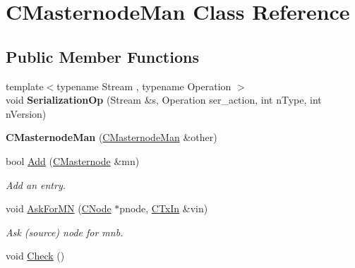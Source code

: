 \hypertarget{class_c_masternode_man}{}\section{C\+Masternode\+Man Class Reference}
\label{class_c_masternode_man}
\subsection*{Public Member Functions}
\begin{DoxyCompactItemize}
\item 
\mbox{\label{class_c_masternode_man_ab8cf7d821cda80603d10fb47f626d514}} 
{\footnotesize template$<$typename Stream , typename Operation $>$ }\\void {\bfseries Serialization\+Op} (Stream \&s, Operation ser\+\_\+action, int n\+Type, int n\+Version)
\item 
\mbox{\label{class_c_masternode_man_aad482f1e78cfb4d7500369ae835dc4a3}} 
{\bfseries C\+Masternode\+Man} (\mbox{\hyperlink{class_c_masternode_man}{C\+Masternode\+Man}} \&other)
\item 
\mbox{\label{class_c_masternode_man_a8e648f7e96931e683b3fd6c98a4c4715}} 
bool \mbox{\hyperlink{class_c_masternode_man_a8e648f7e96931e683b3fd6c98a4c4715}{Add}} (\mbox{\hyperlink{class_c_masternode}{C\+Masternode}} \&mn)
\begin{DoxyCompactList}\small\item\em Add an entry. \end{DoxyCompactList}\item 
\mbox{\label{class_c_masternode_man_ae4de44493ba42d53b9c3e7fba18c0f09}} 
void \mbox{\hyperlink{class_c_masternode_man_ae4de44493ba42d53b9c3e7fba18c0f09}{Ask\+For\+MN}} (\mbox{\hyperlink{class_c_node}{C\+Node}} $\ast$pnode, \mbox{\hyperlink{class_c_tx_in}{C\+Tx\+In}} \&vin)
\begin{DoxyCompactList}\small\item\em Ask (source) node for mnb. \end{DoxyCompactList}\item 
\mbox{\label{class_c_masternode_man_a746a5bed8674a37f69f8987a2bd9bcd1}} 
void \mbox{\hyperlink{class_c_masternode_man_a746a5bed8674a37f69f8987a2bd9bcd1}{Check}} ()

\end{DoxyCompactItemize}
